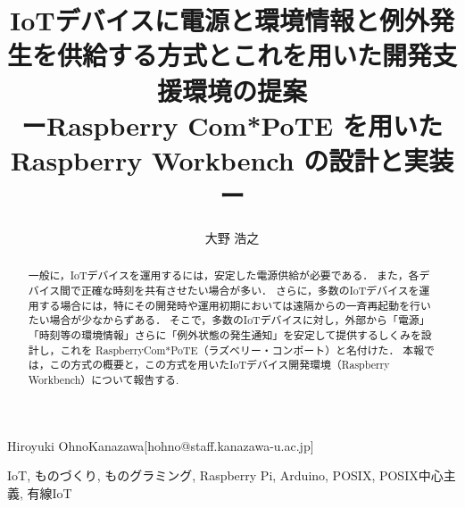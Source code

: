 
\title{
  IoTデバイスに電源と環境情報と例外発生を供給する方式とこれを用いた開発支援環境の提案\\
  ーRaspberry Com*PoTE を用いた Raspberry Workbench の設計と実装ー
}



\author{大野 浩之}{Hiroyuki Ohno}{Kanazawa}[hohno@staff.kanazawa-u.ac.jp]


\begin{abstract}
 一般に，IoTデバイスを運用するには，安定した電源供給が必要である．
 また，各デバイス間で正確な時刻を共有させたい場合が多い．
 さらに，多数のIoTデバイスを運用する場合には，特にその開発時や運用初期においては遠隔からの一斉再起動を行いたい場合が少なからずある．
 そこで，多数のIoTデバイスに対し，外部から「電源」「時刻等の環境情報」さらに「例外状態の発生通知」を安定して提供するしくみを設計し，これを RaspberryCom*PoTE（ラズベリー・コンポート）と名付けた．
 本報では，この方式の概要と，この方式を用いたIoTデバイス開発環境（Raspberry Workbench）について報告する.



\end{abstract}

\begin{jkeyword}
IoT, ものづくり, ものグラミング, Raspberry Pi, Arduino, POSIX, POSIX中心主義, 有線IoT
\end{jkeyword}


